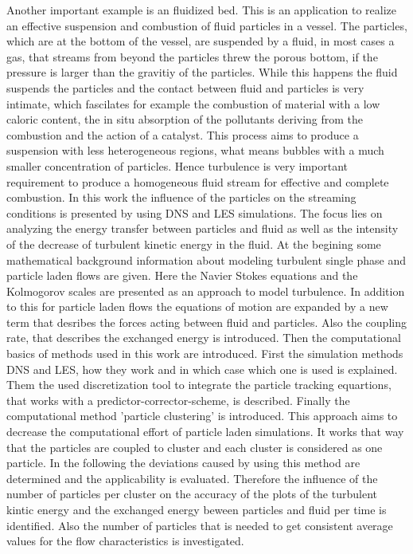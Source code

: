 \documentclass[11pt,a4paper,openany,oneside,parskip=half*]{article}
\begin{document}
Another important example is an fluidized bed. This is an application to realize an effective suspension and combustion of fluid particles in a vessel. The particles, which are at the bottom of the vessel, are suspended by a fluid, in most cases a gas, that streams from beyond the particles threw the porous bottom, if the pressure is larger than the gravitiy of the particles. While this happens the fluid suspends the particles and the contact between fluid and particles is very intimate, which fascilates for example the combustion of material with a low caloric content, the in situ absorption of the pollutants deriving from the combustion and the action of a catalyst. This process aims to produce a suspension with less heterogeneous regions, what means bubbles with a much smaller concentration of particles. Hence turbulence is very important requirement to produce a homogeneous fluid stream for effective and complete combustion.
\newline
In this work the influence of the particles on the streaming conditions is presented by using DNS and LES simulations. The focus lies on analyzing the energy transfer between particles and fluid as well as the intensity of the decrease of turbulent kinetic energy in the fluid.  
At the begining some mathematical background information about modeling turbulent single phase and particle laden flows are given. 
Here the Navier Stokes equations and the Kolmogorov scales are presented as an approach to model turbulence. In addition to this for particle laden flows the equations of motion are expanded by a new term that desribes the forces acting between fluid and particles. 
Also the coupling rate, that describes the exchanged energy is introduced.
Then the computational basics of methods used in this work are introduced. First the simulation methods DNS and LES, how they work and in which case which one is used is explained.
Them the used discretization tool to integrate the particle tracking equartions, that works with a predictor-corrector-scheme, is described.     
Finally the computational method 'particle clustering' is introduced. This approach aims to decrease the computational effort of particle laden simulations. It works that way that the particles are coupled to cluster and each cluster is considered as one particle.
\newline
In the following the deviations caused by using this method are determined and the applicability is evaluated. Therefore the influence of the number of particles per cluster on the accuracy of the plots of the turbulent kintic energy and the exchanged energy beween particles and fluid per time is identified.
Also the number of particles that is needed to get consistent average values for the flow characteristics is investigated.
\pagebreak
\end{document}
